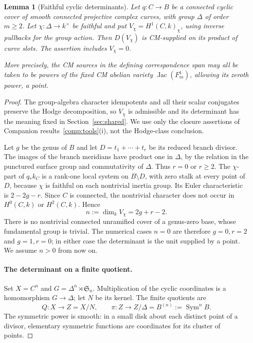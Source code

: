 \documentclass[11pt]{article}
\theoremstyle{plain}
\newtheorem{lemma}[theorem]{Lemma}
\theoremstyle{definition}
\theoremstyle{remark}
\numberwithin{equation}{section}
\begin{document}
\begin{lemma}[Faithful cyclic determinants]
\label{p4:cyclic-determinant}
Let $q:C\to B$ be a connected cyclic cover of smooth connected
projective complex curves, with group $\Delta$ of order $m\ge2$.
Let $\chi:\Delta\to k^\times$ be faithful and put
$V_\chi=H^1(C,k)_\chi$, using inverse pullbacks for the group
action.  Then $D(V_\chi)$ is CM-supplied on its product of
curve slots.  The assertion includes $V_\chi=0$.

More precisely, the CM sources in the defining correspondence
span may all be taken to be powers of the fixed CM abelian variety
$\operatorname{Jac}(F_m^1)$, allowing its zeroth power, a point.
\end{lemma}

\begin{proof}
The group-algebra character idempotents and all their scalar
conjugates preserve the Hodge decomposition, so $V_\chi$ is
admissible and its determinant has the meaning fixed in
Section~\ref{sec:shared}.  We use only the closure assertions
of Companion results~\ref{comp:tools}\textup{(i)}, not the Hodge-class conclusion.

Let $g$ be the genus of $B$ and let
$D=t_1+\cdots+t_r$ be its reduced branch divisor.
The images of the branch meridians have product one in $\Delta$,
by the relation in the punctured surface group and commutativity
of $\Delta$.  Thus $r=0$ or $r\ge2$.  The $\chi$-part of
$q_*k_C$ is a rank-one local system on $B\setminus D$, with
zero stalk at every point of $D$, because $\chi$ is faithful
on each nontrivial inertia group.  Its Euler characteristic is
$2-2g-r$.  Since $C$ is connected, the nontrivial character
does not occur in $H^0(C,k)$ or $H^2(C,k)$.  Hence
\begin{equation}
 \label{p4:eq:cyclic-rank}
 n:=\dim_k V_\chi=2g+r-2.
\end{equation}
There is no nontrivial connected unramified cover of a genus-zero
base, whose fundamental group is trivial.  The numerical cases
$n=0$ are therefore $g=0,r=2$ and $g=1,r=0$; in either case
the determinant is the unit supplied by a point.  We assume
$n>0$ from now on.

\paragraph{The determinant on a finite quotient.}
Set $X=C^n$ and $G=\Delta^n\rtimes\mathfrak S_n$.
Multiplication of the cyclic coordinates is a homomorphism
$G\to\Delta$; let $N$ be its kernel.  The finite quotients are
\begin{equation}
 \label{p4:eq:cyclic-quotients}
 Q:X\longrightarrow Z=X/N,\qquad
 \pi:Z\longrightarrow Z/\Delta
       =B^{(n)}:=\operatorname{Sym}^n B .
\end{equation}
The symmetric power is smooth: in a small disk about each
distinct point of a divisor, elementary symmetric functions
are coordinates for its cluster of points.


\end{proof}
\end{document}
